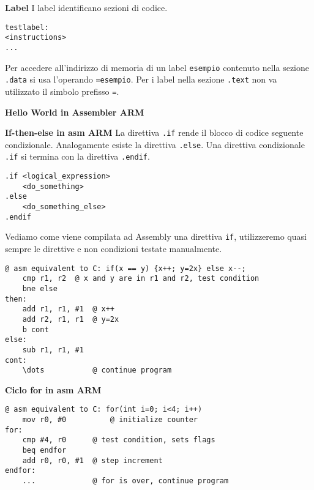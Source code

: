 \begin{defn}
\textbf{Label}
I label identificano sezioni di codice.

\begin{lstlisting}[style=arm]
testlabel:
<instructions>
...
\end{lstlisting}

Per accedere all'indirizzo di memoria di un label \verb|esempio| contenuto nella sezione \verb|.data| si usa l'operando \verb|=esempio|. Per i label nella sezione \verb|.text| non va utilizzato il simbolo prefisso \verb|=|.
\end{defn}

\begin{exmp}
\textbf{Hello World in Assembler ARM}
\end{exmp}

\begin{defn}
\textbf{If-then-else in asm ARM}
La direttiva \verb|.if| rende il blocco di codice seguente condizionale. Analogamente esiste la direttiva \verb|.else|. Una direttiva condizionale \verb|.if| si termina con la direttiva \verb|.endif|.
\begin{lstlisting}[style=armn]
.if <logical_expression>
	<do_something>
.else
	<do_something_else>
.endif
\end{lstlisting}

Vediamo come viene compilata ad Assembly una direttiva \verb|if|, utilizzeremo quasi sempre le direttive e non condizioni testate manualmente.
\begin{lstlisting}[style=armn]
@ asm equivalent to C: if(x == y) {x++; y=2x} else x--;
	cmp r1, r2 	@ x and y are in r1 and r2, test condition
	bne else
then:
	add r1, r1, #1 	@ x++
	add r2, r1, r1	@ y=2x
	b cont
else:
	sub r1, r1, #1
cont:
	\dots			@ continue program
\end{lstlisting}
\end{defn}

\begin{defn}
\textbf{Ciclo for in asm ARM}

\begin{lstlisting}[style=armn]
@ asm equivalent to C: for(int i=0; i<4; i++)
	mov r0, #0			@ initialize counter
for:
	cmp #4, r0		@ test condition, sets flags
	beq endfor
	add r0, r0, #1 	@ step increment
endfor:
	... 			@ for is over, continue program
\end{lstlisting}
\end{defn}


